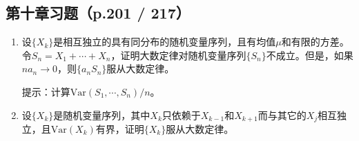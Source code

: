 \documentclass[UTF8]{ctexart}
\begin{document}
\subsection*{第十章习题（p.201 / 217）}

\begin{enumerate}
\renewcommand{\labelenumi}{\textbf{\arabic{enumi}.}}
\setcounter{enumi}{6}
\item 设$\{X_k\}$是相互独立的具有同分布的随机变量序列，且有均值$\mu$和有限的方差。令$S_n=X_1+\cdots+X_n$，证明大数定律对随机变量序列$\{S_n\}$不成立。但是，如果$na_n\to 0$，则$\{a_nS_n\}$服从大数定律。

提示：计算$\mathrm{Var}(S_1,\cdots,S_n)/n$。

\item 设$\{X_k\}$是随机变量序列，其中$X_k$只依赖于$X_{k-1}$和$X_{k+1}$而与其它的$X_j$相互独立，且$\mathrm{Var}(X_k)$有界，证明$\{X_k\}$服从大数定律。
\end{enumerate}
\end{document}
